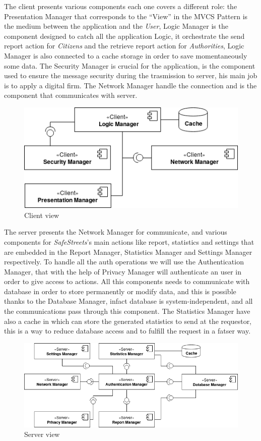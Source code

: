\documentclass{article}
\begin{document}
The client presents various components 
each one covers a different role: the Presentation Manager that corresponds to the “View” in the MVCS Pattern 
is the medium between the application and the \textit{User}, Logic Manager is the component designed to catch 
all the application Logic, it orchestrate the send report action for \textit{Citizens} and the retrieve report 
action for \textit{Authorities}, Logic Manager is also connected to a cache storage in order to save momentaneously 
some data. The Security Manager is crucial for the application, is the component used to ensure the message security 
during the trasmission to server, his main job is to apply a digital firm. The Network Manager handle the
connection and is the component that communicates with server.

\begin{figure}[H]
    \centering
    \includegraphics[scale=0.4]{img/component_diagrams/client_component.png}
    \caption{Client view}
\end{figure}

The server presents the Network Manager for communicate, and various components for \textit{SafeStreets}'s main actions
like report, statistics and settings that are embedded in the Report Manager, Statistics Manager and Settings
Manager respectively. To handle all the auth operations we will use the Authentication Manager, that with the 
help of Privacy Manager will authenticate an user in order to give access to actions. All this components needs 
to communicate with database in order to store permanently or modify data, and this is possible thanks to 
the Database Manager, infact database is system-independent, and all the communications pass through this 
component. The Statistics Manager have also a cache in which can store the generated statistics to send at the
requestor, this is a way to reduce database access and to fulfill the request in a fatser way.  

\begin{figure}[H]
    \centering
    \includegraphics[scale=0.4]{img/component_diagrams/server_component.png}
    \caption{Server view}
\end{figure}
\end{document}
